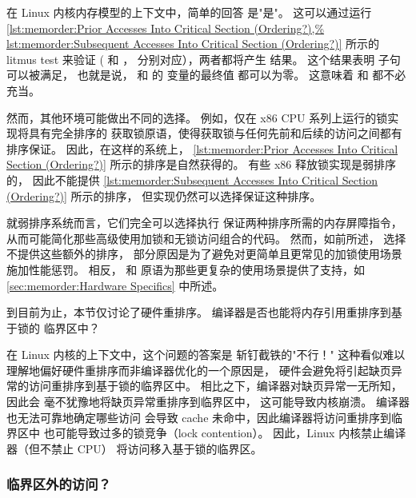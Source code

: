 \begin{listing}

\caption{之后的访问移入临界区（有排序吗？）}
\label{lst:memorder:Subsequent Accesses Into Critical Section (Ordering?)}
\end{listing}

在 Linux 内核内存模型的上下文中，简单的回答
是"是"。
这可以通过运行
\cref{lst:memorder:Prior Accesses Into Critical Section (Ordering?),%
lst:memorder:Subsequent Accesses Into Critical Section (Ordering?)}
所示的 litmus test 来验证
( 和 ，
分别对应），两者都将产生  结果。
这个结果表明  子句可以被满足，
也就是说， 和  的  变量的最终值
都可以为零。
这意味着  和 
都不必充当。

然而，其他环境可能做出不同的选择。
例如，仅在 x86 CPU 系列上运行的锁实现将具有完全排序的
获取锁原语，使得获取锁与任何先前和后续的访问之间都有排序保证。
因此，在这样的系统上，
\cref{lst:memorder:Prior Accesses Into Critical Section (Ordering?)}
所示的排序是自然获得的。
有些 x86 释放锁实现是弱排序的，
因此不能提供
\cref{lst:memorder:Subsequent Accesses Into Critical Section (Ordering?)}
所示的排序，
但实现仍然可以选择保证这种排序。

就弱排序系统而言，它们完全可以选择执行
保证两种排序所需的内存屏障指令，
从而可能简化那些高级使用加锁和无锁访问组合的代码。
然而，如前所述，
选择不提供这些额外的排序，
部分原因是为了避免对更简单且更常见的加锁使用场景施加性能惩罚。
相反， 和 
原语为那些更复杂的使用场景提供了支持，如
\cref{sec:memorder:Hardware Specifics} 中所述。

到目前为止，本节仅讨论了硬件重排序。
编译器是否也能将内存引用重排序到基于锁的
临界区中？

在 Linux 内核的上下文中，这个问题的答案是
斩钉截铁的"不行！"
这种看似难以理解地偏好硬件重排序而非编译器优化的一个原因是，
硬件会避免将引起缺页异常的访问重排序到基于锁的临界区中。
相比之下，编译器对缺页异常一无所知，因此会
毫不犹豫地将缺页异常重排序到临界区中，
这可能导致内核崩溃。
编译器也无法可靠地确定哪些访问
会导致 cache 未命中，因此编译器将访问重排序到临界区中
也可能导致过多的锁竞争（lock contention）。
因此，Linux 内核禁止编译器（但不禁止 CPU）
将访问移入基于锁的临界区。

\subsubsection{临界区外的访问？}
\label{sec:memorder:Accesses Outside of Critical Section?}

